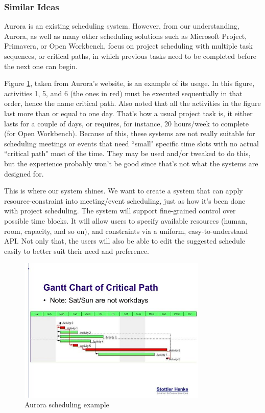 \documentclass{extarticle}
\begin{document}
\subsubsection{Similar Ideas}
Aurora is an existing scheduling system. However, from our understanding, Aurora, as well as many other scheduling solutions such as Microsoft Project, Primavera, or Open Workbench, focus on project scheduling with multiple task sequences, or critical paths, in which previous tasks need to be completed before the next one can begin.

Figure \ref{fig:aurora}, taken from Aurora's website, is an example of its usage. In this figure, activities 1, 5, and 6 (the ones in red) must be executed sequentially in that order, hence the name critical path. Also noted that all the activities in the figure last more than or equal to one day. That's how a usual project task is, it either lasts for a couple of days, or requires, for instance, 20 hours/week to complete (for Open Workbench). Because of this, these systems are not really suitable for scheduling meetings or events that need ``small" specific time slots with no actual ``critical path" most of the time. They may be used and/or tweaked to do this, but the experience probably won't be good since that's not what the systems are designed for.

This is where our system shines. We want to create a system that can apply resource-constraint into meeting/event scheduling, just as how it's been done with project scheduling. The system will support fine-grained control over possible time blocks. It will allow users to specify available resources (human, room, capacity, and so on), and constraints via a uniform, easy-to-understand API. Not only that, the users will also be able to edit the suggested schedule easily to better suit their need and preference.

\begin{figure}[H]
\centering
\includegraphics[width=90mm]{aurora.jpg}
\caption{Aurora scheduling example}
\label{fig:aurora}
\end{figure}
\end{document}
